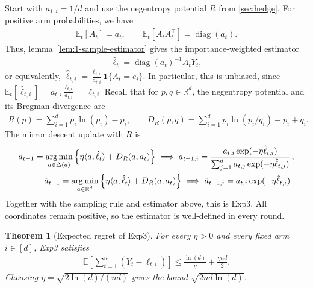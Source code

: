 \documentclass{article}
\theoremstyle{plain}
\newtheorem{theorem}{Theorem}
\theoremstyle{definition}
\newcommand{\Rd}{\mathbb{R}^d}
\newcommand{\argmin}{\operatornamewithlimits{arg\,min}}
\newcommand{\E}{\mathbb E}
\newcommand{\expthree}{\textsf{Exp3}\xspace}
\newcommand{\hl}{\hat{\ell}\xspace}
\begin{document}
Start with $a_{1,i}=1/d$ and use the negentropy potential $R$ from
\cref{sec:hedge}.
For positive arm probabilities, we have
\begin{align*}
    \E_t[A_t] = a_t,
    \qquad
    \E_t[A_t A_t^\top] = \operatorname{diag}(a_t).
\end{align*}
Thus, lemma~\ref{lem:1-sample-estimator} gives the importance-weighted estimator
\begin{align*}
    \hl_t = \operatorname{diag}(a_t)^{-1} A_t Y_t,
\end{align*}
or equivalently, $\hl_{t,i} = \frac{\ell_{t,i}}{a_{t,i}} \mathbf{1}\{A_t=e_i\}$.
In particular, this is unbiased, since
$\E_t[\hl_{t,i}]
    = a_{t,i}\frac{\ell_{t,i}}{a_{t,i}}
    = \ell_{t,i}$
Recall that for $p,q \in \Rd$, the negentropy potential and its Bregman divergence are
\begin{align}
    R(p) = \sum_{i=1}^{d} p_i \ln(p_i) - p_i,
    \qquad
    D_R(p,q) = \sum_{i=1}^{d} p_i \ln(p_i/q_i) - p_i + q_i.
\end{align}
The mirror descent update with $R$ is
\begin{align*}
    a_{t+1}
    = \argmin_{a \in \Delta(d)}
    \left\{\eta\langle a,\hl_t\rangle+D_R(a,a_t)\right\}
    \implies
    a_{t+1,i}
    = \frac{a_{t,i}\exp(-\eta\hl_{t,i})}
    {\sum_{j=1}^d a_{t,j}\exp(-\eta\hl_{t,j})}\,, \\
    \tilde{a}_{t+1}
    = \argmin_{a \in \Rd}
    \left\{\eta\langle a,\hl_t\rangle+D_R(a,a_t)\right\}
    \implies
    \tilde{a}_{t+1,i}
    = a_{t,i}\exp(-\eta\hl_{t,i})\,.
\end{align*}
Together with the sampling rule and estimator above, this is \expthree.
All coordinates remain positive, so the estimator is well-defined in every round.
\begin{theorem}[Expected regret of \expthree]\label{thm:expthree}
    For every $\eta>0$ and every fixed arm $i \in [d]$, \expthree satisfies
    \begin{align*}
        \E\left[\sum_{t=1}^n (Y_t-\ell_{t,i})\right]
        \leq \frac{\ln(d)}{\eta}+\frac{\eta nd}{2}.
    \end{align*}
    Choosing $\eta=\sqrt{2\ln(d)/(nd)}$ gives the bound
    $\sqrt{2nd\ln(d)}$.
\end{theorem}
\end{document}
